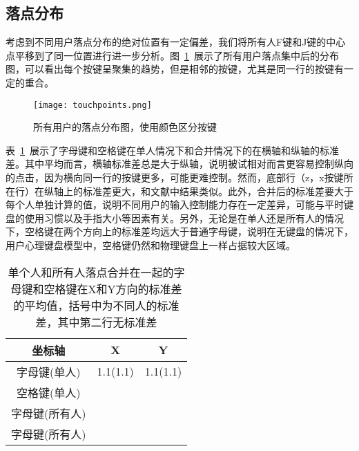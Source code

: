 \subsection{落点分布}
考虑到不同用户落点分布的绝对位置有一定偏差，我们将所有人F键和J键的中心点平移到了同一位置进行进一步分析\cite{flatglass2011findlater}\cite{palmboard2020}\cite{2018shitoast}。图~\ref{fig:points}~展示了所有用户落点集中后的分布图，可以看出每个按键呈聚集的趋势，但是相邻的按键，尤其是同一行的按键有一定的重合。

\begin{figure}[h] %
    \centering
    \texttt{[image: touchpoints.png]}
    \caption{所有用户的落点分布图，使用颜色区分按键}
    \label{fig:points}
\end{figure}

表~\ref{tab:sd}~展示了字母键和空格键在单人情况下和合并情况下的在横轴和纵轴的标准差。其中平均而言，横轴标准差总是大于纵轴，说明被试相对而言更容易控制纵向的点击，因为横向同一行的按键更多，可能更难控制。然而，底部行（z，x按键所在行）在纵轴上的标准差更大，和文献中结果类似\cite{flatglass2011findlater}。此外，合并后的标准差要大于每个人单独计算的值，说明不同用户的输入控制能力存在一定差异，可能与平时键盘的使用习惯以及手指大小等因素有关。另外，无论是在单人还是所有人的情况下，空格键在两个方向上的标准差均远大于普通字母键，说明在无键盘的情况下，用户心理键盘模型中，空格键仍然和物理键盘上一样占据较大区域。

\begin{table}[htb]
    \centering
    \begin{minipage}[t]{0.7\linewidth} %
    \caption[实验一标准差]{单个人和所有人落点合并在一起的字母键和空格键在X和Y方向的标准差的平均值，括号中为不同人的标准差，其中第二行无标准差}
    \label{tab:sd}
      \centering
      \begin{tabularx}{0.7\linewidth}{c c c}
        \toprule[1.5pt]
        坐标轴 & X & Y\\\midrule[1pt]
        字母键(单人) & 1.1(1.1)& 1.1(1.1)\\
        空格键(单人) & &\\
        字母键(所有人) & & \\
        字母键(所有人) & &\\
        \bottomrule[1.5pt]
      \end{tabularx}
    \end{minipage}
  \end{table}

